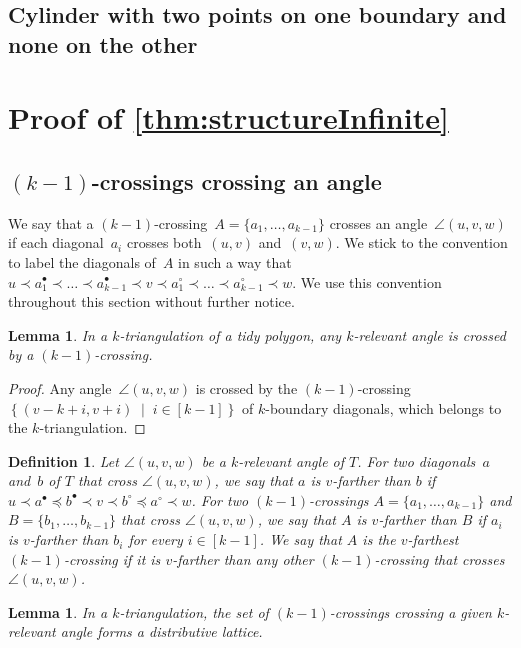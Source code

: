 \documentclass{amsart}
\newtheorem{lemma}[theorem]{Lemma}
\newtheorem{definition}[theorem]{Definition}
\theoremstyle{remark}
\newcommand{\darkblue}{\color{darkblue}} %
\newcommand{\defn}[1]{\textsl{\darkblue #1}} %
\newcommand*{\ktg}[0]{$k$-triangulation\xspace}
\newcommand{\cl}{\prec}
\newcommand{\cle}{\preccurlyeq}
\newcommand{\set}[2]{\left\{ #1 \;\middle|\; #2 \right\}} %
\begin{document}
\subsection{Cylinder with two points on one boundary and none on the other}



\section{Proof of \cref{thm:structureInfinite}}

\subsection{$(k-1)$-crossings crossing an angle}

We say that a $(k-1)$-crossing~$A = \{a_1, \dots, a_{k-1}\}$ crosses an angle~$\angle(u,v,w)$ if each diagonal~$a_i$ crosses both~$(u,v)$ and~$(v,w)$. We stick to the convention to label the diagonals of~$A$ in such a way that $u \cl a^\bullet_1 \cl \dots \cl a^\bullet_{k-1} \cl v \cl a^\circ_1 \cl \dots \cl a^\circ_{k-1} \cl w$. We use this convention throughout this section without further notice.

\begin{lemma}
\label{lem:tidyExists}
In a \ktg of a tidy polygon, any $k$-relevant angle is crossed by a $(k-1)$-crossing.
\end{lemma}

\begin{proof}
Any angle~$\angle(u,v,w)$ is crossed by the $(k-1)$-crossing~$\set{(v-k+i, v+i)}{i \in [k-1]}$ of $k$-boundary diagonals, which belongs to the \ktg.
\end{proof}

\begin{definition}
Let $\angle(u,v,w)$ be a $k$-relevant angle of $T$.
For two diagonals~$a$ and~$b$ of $T$ that cross $\angle(u,v,w)$, we say that $a$ is \defn{$v$-farther} than $b$ if $u \cl a^\bullet \cle b^\bullet \cl v \cl b^\circ \cle a^\circ \cl w$. For two $(k-1)$-crossings $A = \{a_1, \dots, a_{k-1}\}$ and $B = \{b_1, \dots, b_{k-1}\}$ that cross $\angle(u,v,w)$, we say that $A$ is \defn{$v$-farther} than $B$ if $a_i$ is $v$-farther than $b_i$ for every $i \in [k-1]$. We say that $A$ is the \defn{$v$-farthest} $(k-1)$-crossing if it is $v$-farther than any other $(k-1)$-crossing that crosses~$\angle(u,v,w)$.
\end{definition}

\begin{lemma}
In a \ktg, the set of $(k-1)$-crossings crossing a given $k$-relevant angle forms a distributive lattice.
\end{lemma}
\end{document}
